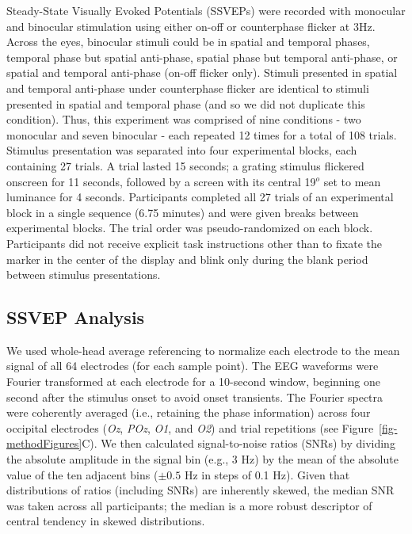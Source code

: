 \documentclass[
  12pt,
]{article}
\begin{document}
Steady-State Visually Evoked Potentials (SSVEPs) were recorded with
monocular and binocular stimulation using either on-off or counterphase
flicker at 3Hz. Across the eyes, binocular stimuli could be in spatial
and temporal phases, temporal phase but spatial anti-phase, spatial
phase but temporal anti-phase, or spatial and temporal anti-phase
(on-off flicker only). Stimuli presented in spatial and temporal
anti-phase under counterphase flicker are identical to stimuli presented
in spatial and temporal phase (and so we did not duplicate this
condition). Thus, this experiment was comprised of nine conditions - two
monocular and seven binocular - each repeated 12 times for a total of
108 trials. Stimulus presentation was separated into four experimental
blocks, each containing 27 trials. A trial lasted 15 seconds; a grating
stimulus flickered onscreen for 11 seconds, followed by a screen with
its central 19\(^o\) set to mean luminance for 4 seconds. Participants
completed all 27 trials of an experimental block in a single sequence
(6.75 minutes) and were given breaks between experimental blocks. The
trial order was pseudo-randomized on each block. Participants did not
receive explicit task instructions other than to fixate the marker in
the center of the display and blink only during the blank period between
stimulus presentations.

\subsection{SSVEP Analysis}\label{ssvep-analysis}

We used whole-head average referencing to normalize each electrode to
the mean signal of all 64 electrodes (for each sample point). The EEG
waveforms were Fourier transformed at each electrode for a 10-second
window, beginning one second after the stimulus onset to avoid onset
transients. The Fourier spectra were coherently averaged (i.e.,
retaining the phase information) across four occipital electrodes
(\emph{Oz}, \emph{POz}, \emph{O1}, and \emph{O2}) and trial repetitions
(see Figure~\ref{fig-methodFigures}C). We then calculated
signal-to-noise ratios (SNRs) by dividing the absolute amplitude in the
signal bin (e.g., 3 Hz) by the mean of the absolute value of the ten
adjacent bins (\(\pm 0.5\) Hz in steps of 0.1 Hz). Given that
distributions of ratios (including SNRs) are inherently skewed, the
median SNR was taken across all participants; the median is a more
robust descriptor of central tendency in skewed distributions.
\end{document}
